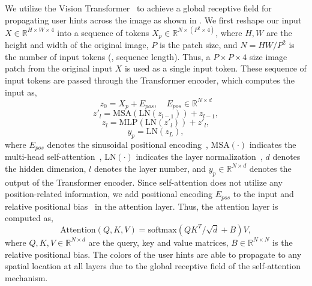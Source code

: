 \documentclass[10pt,twocolumn,letterpaper]{article}
\begin{document}
We utilize the Vision Transformer~\cite{vit} to achieve a global receptive field for propagating user hints across the image as shown in . 
We first reshape our input $X\in \mathbb{R}^{H\times W \times 4}$ into a sequence of tokens $X_p \in \mathbb{R}^{N\times (P^2 \times 4)}$, where $H,W$ are the height and width of the original image, $P$ is the patch size, and $N=HW/P^2$ is the number of input tokens (\ie, sequence length). 
Thus, a $P\times P\times 4$ size image patch from the original input $X$ is used as a single input token.
These sequence of input tokens are passed through the Transformer encoder, which computes the input as, 
\begin{equation}
    z_0 = X_p + E_{pos}, \quad E_{pos} \in \mathbb{R}^{N\times d}
\end{equation}
\vspace{-0.4cm}
\begin{equation}
    z'_l = \text{MSA}(\text{LN}(z_{l-1})) + z_{l-1},
\end{equation}
\vspace{-0.3cm}
\begin{equation}
    z_l = \text{MLP}(\text{LN}(z'_l)) + z'_l,
\end{equation}
\vspace{-0.3cm}
\begin{equation}
    y_p = \text{LN}(z_L),
\end{equation}
where $E_{pos}$ denotes the sinusoidal positional encoding~\cite{vit}, $\text{MSA}(\cdot)$ indicates the multi-head self-attention~\cite{attention}, $\text{LN}(\cdot)$ indicates the layer normalization~\cite{layernorm}, $d$ denotes the hidden dimension, $l$ denotes the layer number, and $y_p \in \mathbb{R}^{N\times d}$ denotes the output of the Transformer encoder. 
Since self-attention does not utilize any position-related information, we add positional encoding $E_{pos}$ to the input and relative positional bias~\cite{swin, raffel2020exploring, hu2018relation, hu2019local} in the attention layer. 
Thus, the attention layer is computed as, 
\begin{equation}
    \text{Attention}(Q,K,V) = \text{softmax}(QK^T / \sqrt{d} + B)V, 
\label{eq:qk}
\end{equation}
where $Q,K,V \in \mathbb{R}^{N\times d}$ are the query, key and value matrices, $B \in \mathbb{R}^{N\times N}$ is the relative positional bias. 
The colors of the user hints are able to propagate to any spatial location at all layers due to the global receptive field of the self-attention mechanism. 
\end{document}

